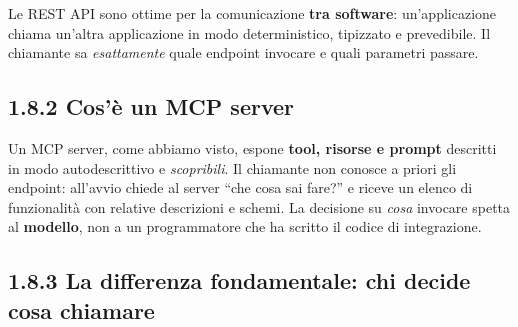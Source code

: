 \documentclass[
  italian,
  10pt,
]{book}
\begin{document}
Le REST API sono ottime per la comunicazione \textbf{tra software}:
un'applicazione chiama un'altra applicazione in modo deterministico,
tipizzato e prevedibile. Il chiamante sa \emph{esattamente} quale
endpoint invocare e quali parametri passare.

\subsection{1.8.2 Cos'è un MCP server}\label{cosuxe8-un-mcp-server}

Un MCP server, come abbiamo visto, espone \textbf{tool, risorse e
prompt} descritti in modo autodescrittivo e \emph{scopribili}. Il
chiamante non conosce a priori gli endpoint: all'avvio chiede al server
``che cosa sai fare?'' e riceve un elenco di funzionalità con relative
descrizioni e schemi. La decisione su \emph{cosa} invocare spetta al
\textbf{modello}, non a un programmatore che ha scritto il codice di
integrazione.

\subsection{1.8.3 La differenza fondamentale: chi decide cosa
chiamare}\label{la-differenza-fondamentale-chi-decide-cosa-chiamare}

\small
\end{document}
